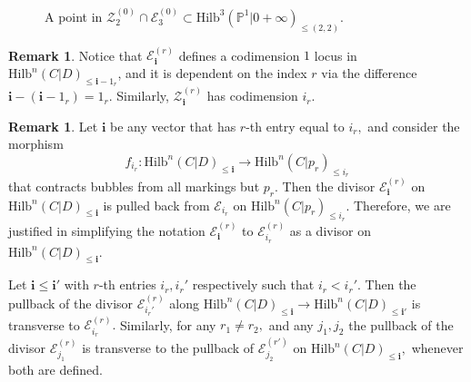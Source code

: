 \documentclass[10.5pt]{amsart}
\theoremstyle{definition}
\theoremstyle{definition}
\theoremstyle{definition}
\theoremstyle{definition}
\newtheorem{remark}[theorem]{Remark}
\newcommand{\PP}{\mathbb{P}}
\newcommand{\calE}{\mathcal{E}}
\newcommand{\Hilb}{\mathrm{Hilb}}
\newcommand{\cZ}{\mathcal{Z}}
\newcommand{\cE}{\mathcal{E}}
\newcommand{\bi}{\boldsymbol{i}}
\begin{document}
\begin{figure}[htp]
{}
\caption{A point in $\mathcal{Z}_{2}^{(0)}\cap \mathcal{E}_{3}^{(0)}\subset \Hilb^{3}(\PP^1|0+\infty)_{\leq (2,2)}.$ }
\label{fig:E3Z2}
\end{figure} 

\begin{remark}Notice that $\cE_{\bi}^{(r)}$ defines a codimension $1$ locus in $\Hilb^n(C|D)_{\le {{\bi}-1_r}}$, and it is dependent on the index $r$ via the difference $\bi- (\bi-1_r) = 1_r.$ Similarly, $\cZ^{(r)}_{\bi}$ has codimension $i_r.$
\end{remark}

\begin{remark}
    Let $\bi$ be any vector that has $r$-th entry equal to $i_r,$ and consider the morphism $$f_{i_r}:\Hilb^n(C|D)_{\leq \bi}\to \Hilb^n(C|p_r)_{\leq i_r}$$ that contracts bubbles from all markings but $p_r.$ Then the divisor $\calE_{\bi}^{(r)}$ on $\Hilb^n(C|D)_{\leq \bi}$ is pulled back from $\calE_{i_r}$ on $\Hilb^n(C|p_r)_{\leq i_r}.$ Therefore, we are justified in simplifying the notation $\calE_{\bi}^{(r)}$ to $\calE_{i_r}^{(r)}$ as a divisor on $\Hilb^n(C|D)_{\leq \bi}.$

    Let $\bi\leq \bi'$ with $r$-th entries $i_r, i_r'$ respectively such that $i_r< i_r'.$ Then the pullback of the divisor $\cE_{i_r'}^{(r)}$ along  $\Hilb^n(C|D)_{\leq \bi}\to \Hilb^n(C|D)_{\leq \bi'}$ is transverse to $\cE_{i_r}^{(r)}.$ Similarly, for any $r_1\neq r_2,$ and any $j_1,j_2$ the pullback of the divisor $\calE_{j_1}^{(r)}$ is transverse to the pullback of $\calE_{j_2}^{(r')}$ on $\Hilb^n(C|D)_{\leq \bi},$ whenever both are defined.
\end{remark} 
\end{document}
